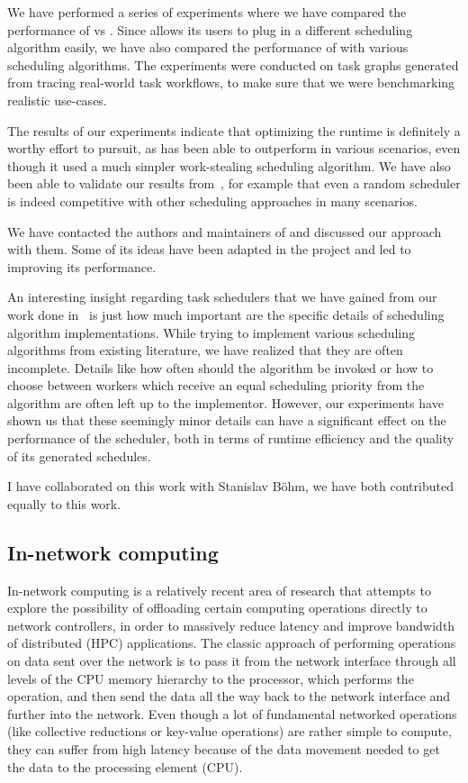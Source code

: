 We have performed a series of experiments where we have compared the performance of \rsds{} vs
\dask{}. Since \rsds{} allows its users to plug in a different scheduling algorithm easily, we
have also compared the performance of \rsds{} with various scheduling algorithms. The experiments
were conducted on task graphs generated from tracing real-world \dask{} task workflows, to make
sure that we were benchmarking realistic use-cases.

The results of our experiments indicate that optimizing the runtime is definitely a worthy effort
to pursuit, as \rsds{} has been able to outperform \dask{} in various scenarios, even though it
used a much simpler work-stealing scheduling algorithm. We have also been able to validate our
results from~\cite{estee}, for example that even a random scheduler is indeed competitive with
other scheduling approaches in many scenarios.

We have contacted the authors and maintainers of \dask{} and discussed our \rsds{} approach with
them.
Some of its ideas have been adapted in the \dask{} project and led to improving its performance.

An interesting insight regarding task schedulers that we have gained from our work done
in~\cite{estee,rsds} is just how much important are the specific details of scheduling algorithm
implementations. While trying to implement various scheduling algorithms from existing
literature, we have realized that they are often incomplete. Details like how
often should the algorithm be invoked or how to choose between workers which receive an equal
scheduling priority from the algorithm are often left up to the implementor. However, our
experiments have shown us that these seemingly minor details can have a significant effect on
the performance of the scheduler, both in terms of runtime efficiency and the quality of its
generated schedules.

I have collaborated on this work with Stanislav Böhm, we have both contributed equally to this
work.

\subsection{In-network computing}
In-network computing is a relatively recent area of research that attempts to explore the
possibility of offloading certain computing operations directly to network controllers, in order
to massively reduce latency and improve bandwidth of distributed (HPC) applications. The classic
approach of performing operations on data sent over the network is to pass it from the network
interface through all levels of the CPU memory hierarchy to the processor, which performs the
operation, and then send the data all the way back to the network interface and further into the
network. Even though a lot of fundamental networked operations (like collective reductions or
key-value operations) are rather simple to compute, they can suffer from high latency because of
the data movement needed to get the data to the processing element (CPU).

